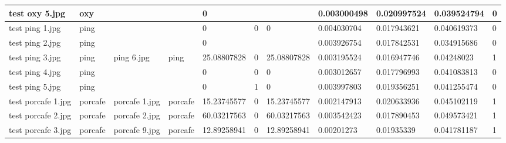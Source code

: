 \begin{landscape}
\begin{longtable}{|p{2cm}|p{1.5cm}|p{2cm}|p{1.5cm}|p{2cm}|p{1cm}|p{2cm}|p{2cm}|p{2cm}|p{2cm}|p{1cm}|}
		test oxy 5.jpg       & oxy              &                       &                             & 0                     &                         &                            & 0.003000498           & 0.020997524           & 0.039524794              & 0                \\ \hline
		test ping 1.jpg      & ping             &                       &                             & 0                     & 0                       & 0                          & 0.004030704           & 0.017943621           & 0.040619373              & 0                \\ \hline
		test ping 2.jpg      & ping             &                       &                             & 0                     &                         &                            & 0.003926754           & 0.017842531           & 0.034915686              & 0                \\ \hline
		test ping 3.jpg      & ping             & ping 6.jpg            & ping                        & 25.08807828           & 0                       & 25.08807828                & 0.003195524           & 0.016947746           & 0.04248023               & 1                \\ \hline
		test ping 4.jpg      & ping             &                       &                             & 0                     & 0                       & 0                          & 0.003012657           & 0.017796993           & 0.041083813              & 0                \\ \hline
		test ping 5.jpg      & ping             &                       &                             & 0                     & 1                       & 0                          & 0.003997803           & 0.019356251           & 0.041255474              & 0                \\ \hline
		test porcafe 1.jpg   & porcafe          & porcafe 1.jpg         & porcafe                     & 15.23745577           & 0                       & 15.23745577                & 0.002147913           & 0.020633936           & 0.045102119              & 1                \\ \hline
		test porcafe 2.jpg   & porcafe          & porcafe 2.jpg         & porcafe                     & 60.03217563           & 0                       & 60.03217563                & 0.003542423           & 0.017890453           & 0.049573421              & 1                \\ \hline
		test porcafe 3.jpg   & porcafe          & porcafe 9.jpg         & porcafe                     & 12.89258941           & 0                       & 12.89258941                & 0.00201273            & 0.01935339            & 0.041781187              & 1                \\ \hline

\end{longtable}
\end{landscape}
